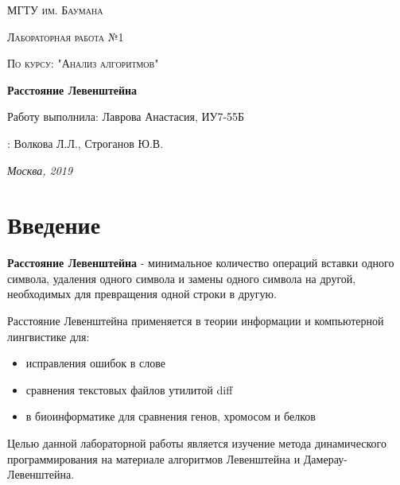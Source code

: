 \documentclass[12pt]{report}
\begin{document}
\begin{titlepage}
	\centering
	{\scshape\LARGE МГТУ им. Баумана \par}
	\vspace{3cm}
	{\scshape\Large Лабораторная работа №1\par}
	\vspace{0.5cm}	
	{\scshape\Large По курсу: "Анализ алгоритмов"\par}
	\vspace{1.5cm}
	{\huge\bfseries Расстояние Левенштейна\par}
	\vspace{2cm}
	\Large Работу выполнила: Лаврова Анастасия, ИУ7-55Б\par
	\vspace{0.5cm}
	:  Волкова Л.Л., Строганов Ю.В.\par

	\vfill
	\large \textit {Москва, 2019} \par
\end{titlepage}

\tableofcontents

\newpage
\chapter*{Введение}
\textbf{Расстояние Левенштейна} - минимальное количество операций вставки одного символа, удаления одного символа и замены одного символа на другой, необходимых для превращения одной строки в другую.

Расстояние Левенштейна применяется в теории информации и компьютерной лингвистике для:

\begin{itemize}
	\item исправления ошибок в слове
	\item сравнения текстовых файлов утилитой diff
	\item в биоинформатике для сравнения генов, хромосом и белков
\end{itemize}

Целью данной лабораторной работы является изучение метода динамического программирования на материале алгоритмов
Левенштейна и Дамерау-Левенштейна. 
\end{document}
